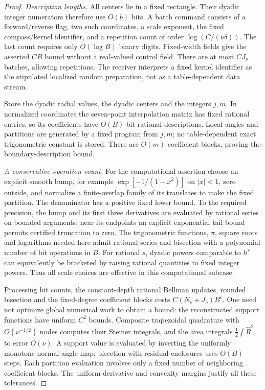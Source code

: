 \begin{proof}
\emph{Description lengths.}
All centers lie in a fixed rectangle. Their dyadic integer numerators
therefore use $O(b)$ bits. A batch command consists of a forward/reverse
flag, two such coordinates, a scale exponent, the fixed compass/kernel
identifier, and a repetition count of order $\log(C/(\nu\delta))$.
The last count requires only $O(\log B)$ binary digits. Fixed-width
fields give the asserted $CB$ bound without a real-valued control
field. There are at most $CJ_\nu$ batches, allowing repetitions.
The receiver interprets a fixed kernel identifier as the stipulated
localized random preparation, not as a table-dependent data stream.

Store the dyadic radial values, the dyadic centers and the integers
$j,m$. In normalized coordinates the seven-point interpolation matrix
has fixed rational entries, so its coefficients have $O(B)$-bit
rational descriptions. Local angles and partitions are generated by
a fixed program from $j,m$; no table-dependent exact trigonometric
constant is stored. There are $O(m)$ coefficient blocks, proving the
boundary-description bound.

\emph{A conservative operation count.}
For the computational assertion choose an explicit smooth bump,
for example $\exp[-1/(1-x^2)]$ on $|x|<1$, zero outside, and normalize
a finite-overlap family of its translates to make the fixed partition.
The denominator has a positive fixed lower bound. To the required
precision, the bump and its first three derivatives are evaluated by
rational series on bounded arguments; near its endpoints an explicit
exponential tail bound permits certified truncation to zero. The
trigonometric functions, $\pi$, square roots and logarithms needed
here admit rational series and bisection with a polynomial number of
bit operations in $B$. For rational $s$, dyadic powers comparable to
$h^s$ can equivalently be bracketed by raising rational quantities to
fixed integer powers. Thus all scale choices are effective in this
computational subcase.

Processing bit counts, the constant-depth rational Bellman updates,
rounded bisection and the fixed-degree coefficient blocks costs
$C(N_\nu+J_\nu)B^c$. One need not optimize global numerical work to
obtain a bound: the reconstructed support functions have uniform
$C^2$ bounds. Composite trapezoidal quadrature with
$O(\nu^{-1/2})$ nodes computes their Steiner integrals, and the area
integrals $\tfrac12\int\widehat R^2$, to error $O(\nu)$. A support
value is evaluated by inverting the uniformly monotone normal-angle
map; bisection with residual enclosures uses $O(B)$ steps. Each
partition evaluation involves only a fixed number of neighboring
coefficient blocks. The uniform derivative and convexity margins
justify all these tolerances.


\end{proof}
